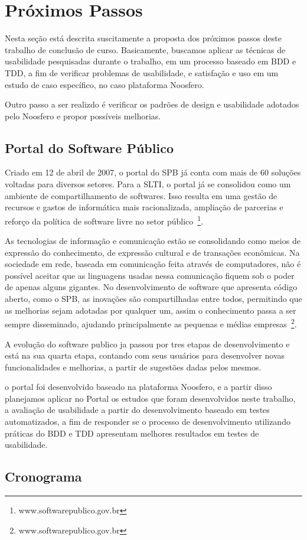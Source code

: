 \section{Próximos Passos}

Nesta seção está descrita suscitamente a proposta dos próximos passos deste trabalho de conclusão de curso. Basicamente, buscamos aplicar as técnicas de usabilidade pesquisadas durante o trabalho, em um processo baseado em BDD e TDD, a fim de verificar problemas de usabilidade, e satisfação e uso em um estudo de caso específico, no caso plataforma Noosfero. 

Outro passo a ser realizdo é verificar os padrões de design e usabilidade adotados pelo Noosfero e propor possíveis melhorias.

\subsection{Portal do Software Público}

Criado em 12 de abril de 2007, o portal do SPB já conta com mais de 60 soluções voltadas para diversos setores. Para a SLTI, o portal já se consolidou como um ambiente de compartilhamento de softwares. Isso resulta em uma gestão de recursos e gastos de informática mais racionalizada, ampliação de parcerias e reforço da política de software livre no setor público~\footnote{www.softwarepublico.gov.br}. 

As tecnologias de informação e comunicação estão se consolidando como meios de expressão do conhecimento, de expressão cultural e de transações econômicas. Na sociedade em rede, baseada em comunicação feita através de computadores, não é possível aceitar que as linguagens usadas nessa comunicação fiquem sob o poder de apenas alguns gigantes. No desenvolvimento de software que apresenta código aberto, como o SPB, as inovações são compartilhadas entre todos, permitindo que as melhorias sejam adotadas por qualquer um, assim o conhecimento passa a ser sempre disseminado, ajudando principalmente as pequenas e médias empresas~\footnote{www.softwarepublico.gov.br}.

A evolução do software publico ja passou por tres etapas de desenvolvimento e está na sua quarta etapa, contando com seus usuários para desenvolver novas funcionalidades e melhorias, a partir de sugestões dadas pelos mesmos.

o portal foi desenvolvido baseado na plataforma Noosfero, e a partir disso planejamos aplicar no Portal os estudos que foram desenvolvidos neste trabalho, a avaliação de usabilidade a partir do desenvolvimento baseado em testes automatizados, a fim de responder se o processo de desenvolvimento utilizando práticas do BDD e TDD apresentam melhores resultados em testes de usabilidade.

\subsection{Cronograma}